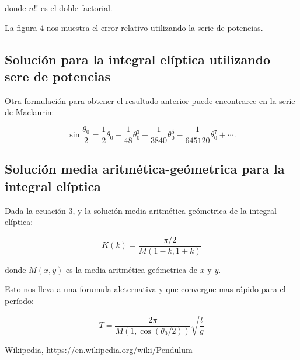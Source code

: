 \documentclass[12pt,letterpaper]{article}
\begin{document}
donde $ n!! $ es el doble factorial.

La figura 4 nos muestra el error relativo utilizando la serie de potencias. 

\subsection{Solución para la integral elíptica utilizando sere de potencias}

Otra formulación para obtener el resultado anterior puede encontrarce en la serie de Maclaurin: 

$$ \sin\frac{\theta_0}{2} = \frac{1}{2}\theta_0 - \frac{1}{48}\theta^3_0 + \frac{1}{3840}\theta^5_0 - \frac{1}{645120}\theta^7_0 + \cdots . $$

\subsection{Solución media aritmética-geómetrica para la integral elíptica}

Dada la ecuación 3, y la solución media aritmética-geómetrica de la integral elíptica: 

$$ K(k) = \frac{\pi/2}{M(1-k, 1+k)} $$

donde $ M(x,y) $ es la media aritmética-geómetrica de $ x $ y $ y $. 

Esto nos lleva a una forumula aleternativa y que convergue mas rápido para el período:

$$ T = \frac{2\pi}{M(1, \cos(\theta_0/2))} \sqrt{\frac{l}{g}} $$ 

\begin{thebibliography}{widestlabel}
 Wikipedia, https://en.wikipedia.org/wiki/Pendulum
\end{thebibliography}
\end{document}
